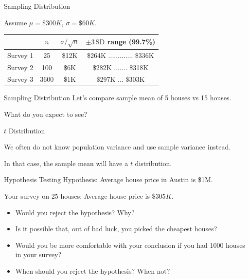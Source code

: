 \documentclass{beamer}\usepackage[]{graphicx}\usepackage[]{color}
\begin{document}
\begin{darkframes}
    
    
    \begin{frame}[label=lists]{Sampling Distribution}
    
    Assume $\mu=\$300K$, $\sigma=\$60K$. \newline
    
   	\begin{table}[!b]
        {\carlitoTLF %
        \begin{tabularx}{\textwidth}{Xccc}
          \textbf{} &  $n$ & $\sigma/\sqrt{n}$  & $\pm 3\,\text{SD}$ range (99.7\%) \\
          \toprule
          Survey 1     & 25   &  \$12K	&\$264K ............. \$336K   \\
          Survey 2     & 100  &  \$6K	&\$282K ....... \$318K   \\
		  Survey 3     & 3600 &  \$1K	&\$297K ... \$303K   \\
          \bottomrule
        \end{tabularx}}	
	\end{table}   
    
    \end{frame}
    
    
	\begin{frame}[label=lists]{Sampling Distribution}
		Let's compare sample mean of 5 houses vs 15 houses. \newline
		
		What do you expect to see?
	\end{frame}
	

    
    
    \begin{frame}[label=lists]{$t$ Distribution}
    
    	We often do not know population variance and use sample variance instead. \newline
    	
    	
		In that case, the sample mean will have a \alert{$t$ distribution}.
	\end{frame}	
    
    
    
    \begin{frame}[label=lists]{Hypothesis Testing}
    Hypothesis: Average house price in Austin is \$1M. \pause
    
    Your survey on 25 houses: Average house price is \$$305K$. \newline \pause
    
    \begin{itemize}
      \item Would you reject the hypothesis? Why? \pause
      \item Is it possible that, out of bad luck, you picked the cheapest houses? \pause
      \item Would you be more comfortable with your conclusion if you had 1000 houses in your survey? \pause
      \item When should you reject the hypothesis? When not?
   \end{itemize}



\end{frame}
\end{darkframes}
\end{document}
